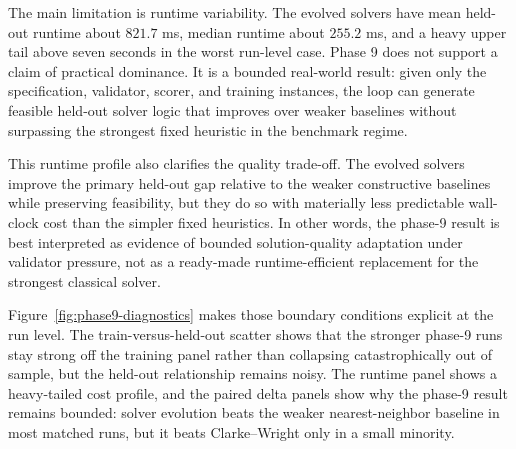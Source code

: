 The main limitation is runtime variability. The evolved solvers have mean held-out runtime about
$821.7$ ms, median runtime about $255.2$ ms, and a heavy upper tail above seven seconds in the
worst run-level case. Phase 9 does not support a claim of practical dominance. It is a bounded
real-world result: given only the specification, validator, scorer, and training instances, the
loop can generate feasible held-out solver logic that improves over weaker baselines without
surpassing the strongest fixed heuristic in the benchmark regime.

This runtime profile also clarifies the quality trade-off. The evolved solvers improve the primary
held-out gap relative to the weaker constructive baselines while preserving feasibility, but they do
so with materially less predictable wall-clock cost than the simpler fixed heuristics. In other
words, the phase-9 result is best interpreted as evidence of bounded solution-quality adaptation
under validator pressure, not as a ready-made runtime-efficient replacement for the strongest
classical solver.

Figure~\ref{fig:phase9-diagnostics} makes those boundary conditions explicit at the run level. The
train-versus-held-out scatter shows that the stronger phase-9 runs stay strong off the training
panel rather than collapsing catastrophically out of sample, but the held-out relationship remains
noisy. The runtime panel shows a heavy-tailed cost profile, and the paired delta panels show
why the phase-9 result remains bounded: solver evolution beats the weaker nearest-neighbor
baseline in most matched runs, but it beats Clarke--Wright only in a small minority.

